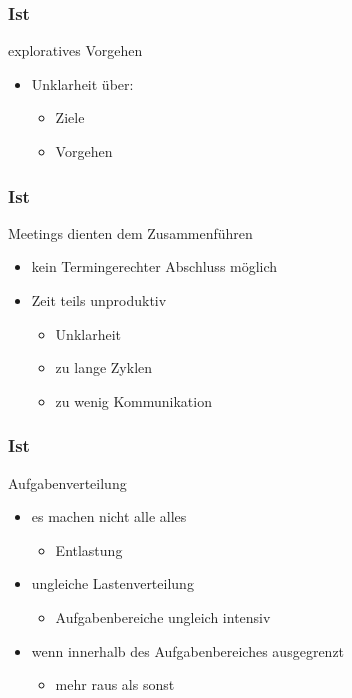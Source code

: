 \documentclass{beamer}
\begin{document}
\begin{frame}
\frametitle{Ist}
exploratives Vorgehen

  \begin{itemize}
    \item Unklarheit über:
      \begin{itemize}
        \item Ziele
        \item Vorgehen
      \end{itemize}
  \end{itemize}

\end{frame}

\begin{frame}
\frametitle{Ist}
Meetings dienten dem Zusammenführen
  \begin{itemize}
    \item kein Termingerechter Abschluss möglich
    \item Zeit teils unproduktiv
      \begin{itemize}
        \item Unklarheit
        \item zu lange Zyklen
        \item zu wenig Kommunikation
      \end{itemize}

  \end{itemize}

\end{frame}

\begin{frame}
\frametitle{Ist}
Aufgabenverteilung
  \begin{itemize}
    \item es machen nicht alle alles
      \begin{itemize}
        \item Entlastung
      \end{itemize}
    \item ungleiche Lastenverteilung
      \begin{itemize}
        \item Aufgabenbereiche ungleich intensiv
      \end{itemize}
    \item  wenn innerhalb des Aufgabenbereiches ausgegrenzt
      \begin{itemize}
        \item  mehr raus als sonst
      \end{itemize}

  \end{itemize}

\end{frame}
\end{document}
